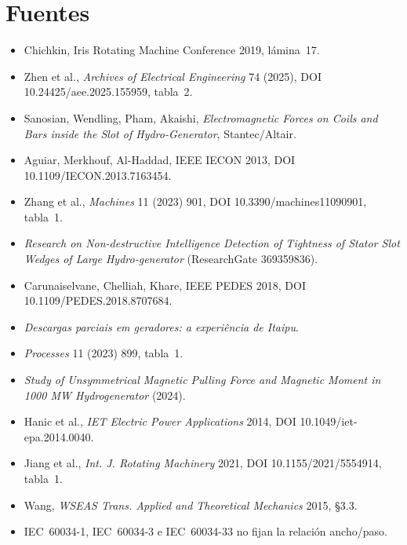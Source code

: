 \documentclass[11pt,a4paper]{article}
\begin{document}
\section{Fuentes}
{\footnotesize
\begin{itemize}[leftmargin=4.2em, labelwidth=3.6em, align=left]
  \item[H1] Chichkin, Iris Rotating Machine Conference 2019, lámina~17.
  \item[H2] Zhen et al., \emph{Archives of Electrical Engineering} 74 (2025), DOI 10.24425/aee.2025.155959, tabla~2.
  \item[H3, H4] Sanosian, Wendling, Pham, Akaishi, \emph{Electromagnetic Forces on Coils and Bars inside the Slot of Hydro-Generator}, Stantec/Altair.
  \item[H5] Aguiar, Merkhouf, Al-Haddad, IEEE IECON 2013, DOI 10.1109/IECON.2013.7163454.
  \item[H6] Zhang et al., \emph{Machines} 11 (2023) 901, DOI 10.3390/machines11090901, tabla~1.
  \item[H7] \emph{Research on Non-destructive Intelligence Detection of Tightness of Stator Slot Wedges of Large Hydro-generator} (ResearchGate 369359836).
  \item[H8] Carunaiselvane, Chelliah, Khare, IEEE PEDES 2018, DOI 10.1109/PEDES.2018.8707684.
  \item[H9] \emph{Descargas parciais em geradores: a experiência de Itaipu}.
  \item[H10] \emph{Processes} 11 (2023) 899, tabla~1.
  \item[H11] \emph{Study of Unsymmetrical Magnetic Pulling Force and Magnetic Moment in 1000 MW Hydrogenerator} (2024).
  \item[T1] Hanic et al., \emph{IET Electric Power Applications} 2014, DOI 10.1049/iet-epa.2014.0040.
  \item[T2] Jiang et al., \emph{Int. J. Rotating Machinery} 2021, DOI 10.1155/2021/5554914, tabla~1.
  \item[T3] Wang, \emph{WSEAS Trans. Applied and Theoretical Mechanics} 2015, §3.3.
  \item[Normas] IEC~60034-1, IEC~60034-3 e IEC~60034-33 no fijan la relación ancho/paso.
\end{itemize}}
\end{document}
